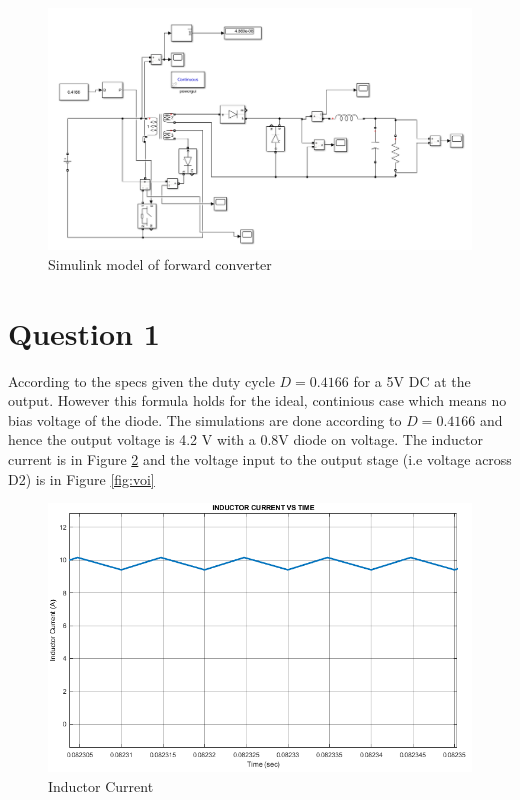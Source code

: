 \documentclass[oneside,12pt]{article}
\begin{document}
\begin{figure}[H]
	\centering
	\includegraphics[width=0.8\linewidth]{model}
	\caption{Simulink model of forward converter}
	\label{fig:model}
\end{figure}

\section{Question 1}
According to the specs given the duty cycle $ D= 0.4166 $ for a 5V DC at the output. However this formula holds for the ideal, continious case which means no bias voltage of the diode. The simulations are done according to $ D= 0.4166 $ and hence the output voltage is 4.2 V with a 0.8V diode on voltage. The inductor current is in Figure \ref{fig:il} and the voltage input to the output stage (i.e voltage across D2) is in Figure \ref{fig:voi}

\begin{figure}[H]
	\centering
	\includegraphics[scale=0.8]{../q1/i_L}
	\caption{Inductor Current}
	\label{fig:il}
\end{figure}
\end{document}
